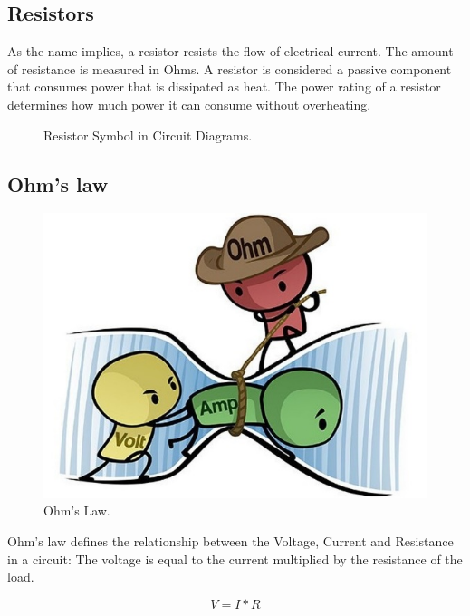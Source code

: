 \subsection{Resistors}

As the name implies, a resistor resists the flow of electrical current. The amount of resistance is measured in Ohms. A resistor is considered a passive component that consumes power that is dissipated as heat. The power rating of a resistor determines how much power it can consume without overheating.

\begin{figure}[!ht]
    \centering
    
    \caption{Resistor Symbol in Circuit Diagrams.} \label{fig:resistor}
\end{figure}

\subsection{Ohm's law}

\begin{figure}[!ht]
	\centering
	\includegraphics{images/ohms_law_cartoon.png}
	\caption{Ohm's Law.} \label{fig:ohms_law_cartoon}
\end{figure}

Ohm's law defines the relationship between the Voltage, Current and Resistance in a circuit: The voltage is equal to the current multiplied by the resistance of the load. 

\begin{displaymath}\label{eq:ohm}
    V=I*R
\end{displaymath}

